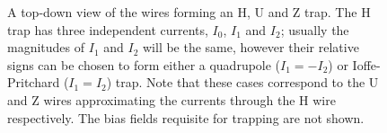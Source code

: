 \begin{figure}
  \centering
{}
  \caption{
    A top-down view of the wires forming an H, U and Z trap. The H trap has
    three independent currents, $I_0$, $I_1$ and $I_2$; usually the magnitudes
    of $I_1$ and $I_2$ will be the same, however their relative signs can be
    chosen to form either a quadrupole ($I_1 = -I_2$) or Ioffe-Pritchard ($I_1 =
    I_2$) trap. Note that these cases correspond to the U and Z wires
    approximating the currents through the H wire respectively. The bias fields
    requisite for trapping are not shown.
  }
  \label{litrev:fig:trapvariations}
\end{figure}

